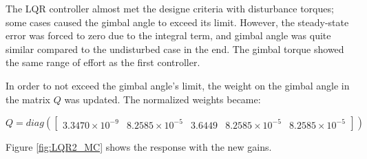 \documentclass[]{aiaa-tc}%
\begin{document}
	The LQR controller almost met the designe criteria with disturbance torques; some cases caused the gimbal angle to exceed its limit. However, the steady-state error was forced to zero due to the integral term, and gimbal angle was quite similar compared to the undisturbed case in the end. The gimbal torque showed the same range of effort as the first controller. 

	\vspace{5 mm}

	In order to not exceed the gimbal angle's limit, the weight on the gimbal angle in the matrix $Q$ was updated. The normalized weights became:

	\vspace{5 mm}

{\centering
 $Q=diag(\begin{bmatrix}
3.3470\times10^{-9} & 8.2585\times10^{-5} & 3.6449 & 8.2585\times10^{-5} & 8.2585\times10^{-5}
\end{bmatrix})$\par
}

	\vspace{5 mm}

Figure \ref{fig:LQR2_MC} shows the response with the new gains.
\end{document}
